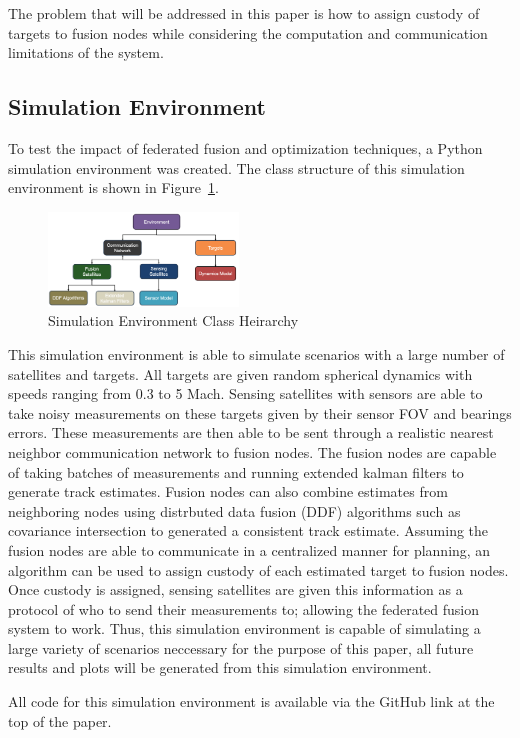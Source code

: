     The problem that will be addressed in this paper is how to assign custody of targets to fusion nodes while considering the computation and communication limitations of the system.
    


\subsection{Simulation Environment}

    To test the impact of federated fusion and optimization techniques, a Python simulation environment was created. 
    The class structure of this simulation environment is shown in Figure~\ref{fig:simulation_environment}.

    \begin{figure}[h]
        \centering
        \includegraphics[width=0.45\textwidth]{figs/code_class_heirarchy.png}
        \caption{Simulation Environment Class Heirarchy}
        \label{fig:simulation_environment}
    \end{figure}

    This simulation environment is able to simulate scenarios with a large number of satellites and targets.
    All targets are given random spherical dynamics with speeds ranging from 0.3 to 5 Mach.
    Sensing satellites with sensors are able to take noisy measurements on these targets given by their sensor FOV and bearings errors.
    These measurements are then able to be sent through a realistic nearest neighbor communication network to fusion nodes.
    The fusion nodes are capable of taking batches of measurements and running extended kalman filters to generate track estimates. 
    Fusion nodes can also combine estimates from neighboring nodes using distrbuted data fusion (DDF) algorithms such as covariance intersection to generated a consistent track estimate.
    Assuming the fusion nodes are able to communicate in a centralized manner for planning, an algorithm can be used to assign custody of each estimated target to fusion nodes.
    Once custody is assigned, sensing satellites are given this information as a protocol of who to send their measurements to; allowing the federated fusion system to work.
    Thus, this simulation environment is capable of simulating a large variety of scenarios neccessary for the purpose of this paper, all future results and plots will be generated from this simulation environment.

    All code for this simulation environment is available via the GitHub link at the top of the paper.
    

